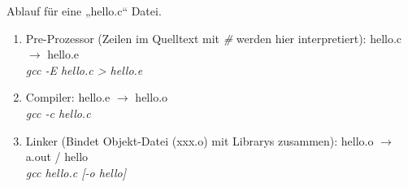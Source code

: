 



\pagestyle{empty}

\begin{multicols}{3}
Ablauf für eine „hello.c“ Datei.
\begin{enumerate}
\item Pre-Prozessor (Zeilen im Quelltext mit \emph{\#} werden hier interpretiert): hello.c $\rightarrow$ hello.e \\
\emph{gcc -E hello.c > hello.e}
\item Compiler: hello.e $\rightarrow$ hello.o\\
\emph{gcc -c hello.c}
\item Linker (Bindet Objekt-Datei (xxx.o) mit Librarys zusammen): hello.o $\rightarrow$ a.out / hello\\
\emph{gcc hello.c [-o hello]}
\end{enumerate}


\end{multicols}

